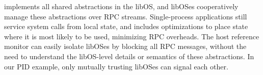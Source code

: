 


\sysname{} implements all shared abstractions in the libOS, and libOSes cooperatively manage these abstractions
over RPC streams.
Single-process applications still service system calls from local state, and \sysname{} 
includes optimizations to place state where it is most likely to be used,
minimizing RPC overheads.
The host reference monitor can easily isolate libOSes
by 
blocking all
RPC messages, %
without the need to understand the libOS-level details or semantics of these abstractions.
In our PID example, only mutually trusting libOSes can signal each other.



